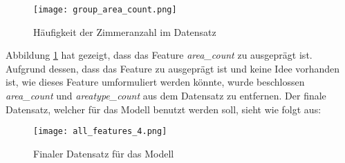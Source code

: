 \begin{figure}[h]
    \centering
    \texttt{[image: group\_area\_count.png]}
    \caption[Häufigkeit der Zimmeranzahl im Datensatz]{Häufigkeit der Zimmeranzahl im Datensatz}
    \label{img:haufigkeit_area_count}
\end{figure}
Abbildung \ref{img:haufigkeit_area_count} hat gezeigt, dass das Feature \emph{area\_count} zu ausgeprägt ist. Aufgrund dessen, dass das Feature zu ausgeprägt ist und keine Idee vorhanden ist, wie dieses Feature umformuliert werden könnte, wurde beschlossen \emph{area\_count} und \emph{areatype\_count} aus dem Datensatz zu entfernen.
\newline
\newline
Der finale Datensatz, welcher für das Modell benutzt werden soll, sieht wie folgt aus:

\begin{figure}[h]
    \centering
    \texttt{[image: all\_features\_4.png]}
    \caption[Finaler Datensatz für das Modell]{Finaler Datensatz für das Modell}
    \label{img:all_features_4}
\end{figure}